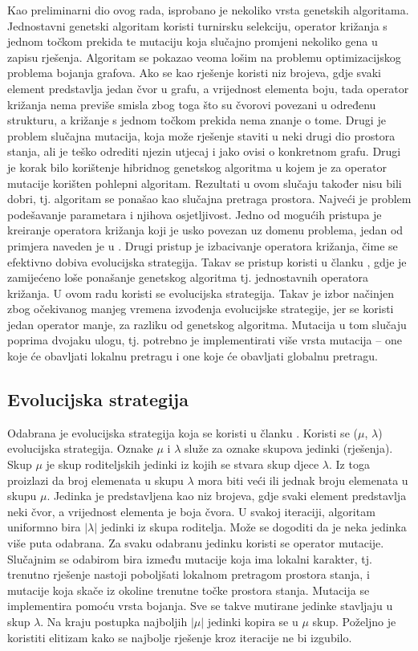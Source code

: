 \documentclass[times, utf8, diplomski, numeric]{fer}
\begin{document}
Kao preliminarni dio ovog rada, isprobano je nekoliko vrsta genetskih algoritama. Jednostavni genetski algoritam koristi turnirsku selekciju, operator križanja s jednom točkom prekida te mutaciju koja slučajno promjeni nekoliko gena u zapisu rješenja. Algoritam se pokazao veoma lošim na problemu optimizacijskog problema bojanja grafova. Ako se kao rješenje koristi niz brojeva, gdje svaki element predstavlja jedan čvor u grafu, a vrijednost elementa boju, tada operator križanja nema previše smisla zbog toga što su čvorovi povezani u određenu strukturu, a križanje s jednom točkom prekida nema znanje o tome. Drugi je problem slučajna mutacija, koja može rješenje staviti u neki drugi dio prostora stanja, ali je teško odrediti njezin utjecaj i jako ovisi o konkretnom grafu. Drugi je korak bilo korištenje hibridnog genetskog algoritma u kojem je za operator mutacije korišten pohlepni algoritam. Rezultati u ovom slučaju također nisu bili dobri, tj. algoritam se ponašao kao slučajna pretraga prostora. Najveći je problem podešavanje parametara i njihova osjetljivost. Jedno od mogućih pristupa je kreiranje operatora križanja koji je usko povezan uz domenu problema, jedan od primjera naveden je u \cite{lit17}. Drugi pristup je izbacivanje operatora križanja, čime se efektivno dobiva evolucijska strategija. Takav se pristup koristi u članku \cite{lit12}, gdje je zamijećeno loše ponašanje genetskog algoritma tj. jednostavnih operatora križanja. U ovom radu koristi se evolucijska strategija. Takav je izbor načinjen zbog očekivanog manjeg vremena izvođenja evolucijske strategije, jer se koristi jedan operator manje, za razliku od genetskog algoritma. Mutacija u tom slučaju poprima dvojaku ulogu, tj. potrebno je implementirati više vrsta mutacija -- one koje će obavljati lokalnu pretragu i one koje će obavljati globalnu pretragu.

\subsection{Evolucijska strategija}

Odabrana je evolucijska strategija koja se koristi u članku \cite{lit17}. Koristi se ($\mu$, $\lambda$) evolucijska strategija. Oznake $\mu$ i $\lambda$ služe za oznake skupova jedinki (rješenja). Skup $\mu$ je skup roditeljskih jedinki iz kojih se stvara skup djece $\lambda$. Iz toga proizlazi da broj elemenata u skupu $\lambda$ mora biti veći ili jednak broju elemenata u skupu $\mu$. Jedinka je predstavljena kao niz brojeva, gdje svaki element predstavlja neki čvor, a vrijednost elementa je boja čvora. U svakoj iteraciji, algoritam uniformno bira $|\lambda|$ jedinki iz skupa roditelja. Može se dogoditi da je neka jedinka više puta odabrana. Za svaku odabranu jedinku koristi se operator mutacije. Slučajnim se odabirom bira između mutacije koja ima lokalni karakter, tj. trenutno rješenje nastoji poboljšati lokalnom pretragom prostora stanja, i mutacije koja skače iz okoline trenutne točke prostora stanja. Mutacija se implementira pomoću vrsta bojanja. Sve se takve mutirane jedinke stavljaju u skup $\lambda$. Na kraju postupka najboljih $|\mu|$ jedinki kopira se u $\mu$ skup. Poželjno je koristiti elitizam kako se najbolje rješenje kroz iteracije ne bi izgubilo.
\end{document}
